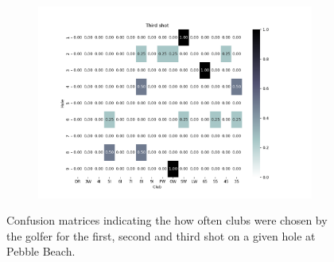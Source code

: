 \documentclass{kththesis}
\begin{document}
\begin{figure}
\begin{subfigure}{\textwidth}
    \includegraphics[height=0.3\textheight]{L2ClubChoices/Ludvig_Pebble_Club_Choices_Third_Shot.png} 
    \end{subfigure}
    \caption{Confusion matrices indicating the how often clubs were chosen by the golfer for the first, second and third shot on a given hole at Pebble Beach.}
    \label{fig:L2_pebble_club_choice_confusion}
\end{figure}
\end{document}
